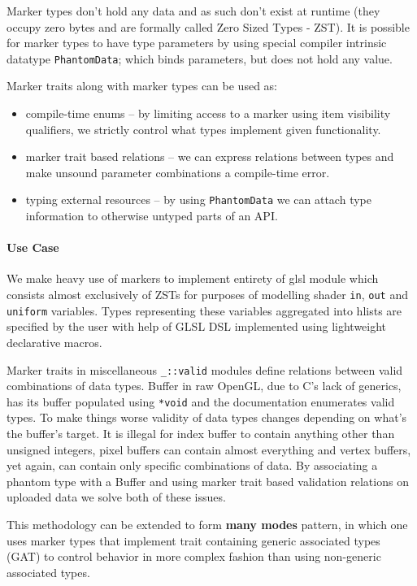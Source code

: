 Marker types don't hold any data and as such don't exist at runtime (they occupy zero bytes and are formally called Zero Sized Types - ZST).
It is possible for marker types to have type parameters by using special compiler intrinsic datatype \texttt{PhantomData}; which binds parameters, but does not hold any value.

Marker traits along with marker types can be used as:
\begin{itemize}
    \item compile-time enums -- by limiting access to a marker using item visibility qualifiers, we strictly control what types implement given functionality.
    \item marker trait based relations -- we can express relations between types and make unsound parameter combinations a compile-time error.
    \item typing external resources -- by using \texttt{PhantomData} we can attach type information to otherwise untyped parts of an API.
\end{itemize}

\paragraph{Use Case}

We make heavy use of markers to implement entirety of glsl module which consists almost exclusively of ZSTs for purposes of modelling shader \texttt{in}, \texttt{out} and \texttt{uniform} variables.
Types representing these variables aggregated into hlists are specified by the user with help of GLSL DSL implemented using lightweight declarative macros.

Marker traits in miscellaneous \texttt{\_::valid} modules define relations between valid combinations of data types. Buffer in raw OpenGL, due to C's lack of generics, has its buffer populated using \texttt{*void} 
and the documentation enumerates valid types. To make things worse validity of data types changes depending on what's the buffer's target.
It is illegal for index buffer to contain anything other than unsigned integers, pixel buffers can contain almost everything and vertex buffers, yet again, can contain only specific combinations of data.
By associating a phantom type with a Buffer and using marker trait based validation relations on uploaded data we solve both of these issues.

This methodology can be extended to form \textbf{many modes} pattern, in which one uses marker types that implement trait 
containing generic associated types (GAT) to control behavior in more complex fashion than using non-generic associated types.

